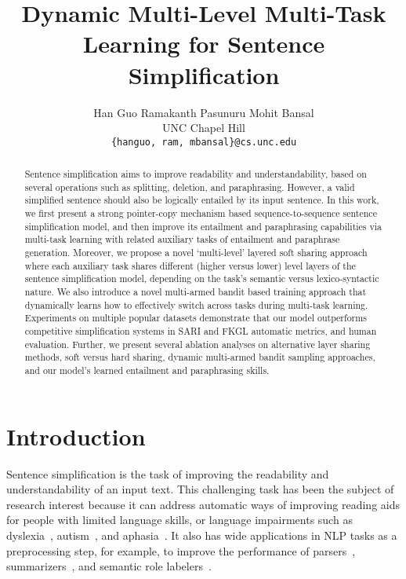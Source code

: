 \documentclass[11pt]{article}
\title{Dynamic Multi-Level Multi-Task Learning for Sentence Simplification}
\author{Han Guo \;\;\;\;\;\;\; Ramakanth Pasunuru \;\;\;\;\;\;\; Mohit Bansal \\
  UNC Chapel Hill \\
  {\tt \{hanguo, ram, mbansal\}@cs.unc.edu} \\
 }
\date{}
\begin{document}
\maketitle


\begin{abstract}
Sentence simplification aims to improve readability and understandability, based on several operations such as splitting, deletion, and paraphrasing. However, a valid simplified sentence should also be logically entailed by its input sentence. In this work, we first present a strong pointer-copy mechanism based sequence-to-sequence sentence simplification model, and then improve its entailment and paraphrasing capabilities via multi-task learning with related auxiliary tasks of entailment and paraphrase generation. Moreover, we propose a novel `multi-level' layered soft sharing approach where each auxiliary task shares different (higher versus lower) level layers of the sentence simplification model, depending on the task's semantic versus lexico-syntactic nature. We also introduce a novel multi-armed bandit based training approach that dynamically learns how to effectively switch across tasks during multi-task learning. Experiments on multiple popular datasets demonstrate that our model outperforms competitive simplification systems in SARI and FKGL automatic metrics, and human evaluation. Further, we present several ablation analyses on alternative layer sharing methods, soft versus hard sharing, dynamic multi-armed bandit sampling approaches, and our model's learned entailment and paraphrasing skills. 
\end{abstract}

\section{Introduction}
\label{sec-intro}


Sentence simplification is the task of improving the readability and understandability of an input text. This challenging task has been the subject of research interest because it can address automatic ways of improving reading aids for people with limited language skills, or language impairments such as dyslexia~\cite{rello2013impact}, autism~\cite{evans2014evaluation}, and aphasia~\cite{carroll1999simplifying}. It also has wide applications in NLP tasks as a preprocessing step, for example, to improve the performance of parsers~\cite{chandrasekar1996motivations}, summarizers~\cite{klebanov2004text}, and semantic role labelers~\cite{vickrey2008sentence,woodsend2014text}.
\end{document}
